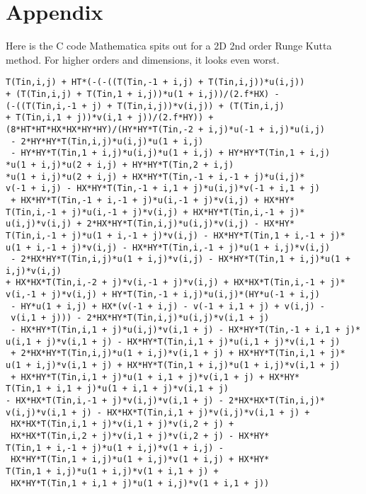 \documentclass[paper=a4, fontsize=11pt]{scrartcl} %
\numberwithin{equation}{section} %
\numberwithin{figure}{section} %
\numberwithin{table}{section} %
\begin{document}
\newpage

\section{Appendix}
Here is the C code Mathematica spits out for a 2D 2nd order Runge Kutta method. For higher orders and dimensions, it looks even worst.
\begin{verbatim}
T(Tin,i,j) + HT*(-(-((T(Tin,-1 + i,j) + T(Tin,i,j))*u(i,j)) 
+ (T(Tin,i,j) + T(Tin,1 + i,j))*u(1 + i,j))/(2.f*HX) - 
(-((T(Tin,i,-1 + j) + T(Tin,i,j))*v(i,j)) + (T(Tin,i,j) 
+ T(Tin,i,1 + j))*v(i,1 + j))/(2.f*HY)) + 
(8*HT*HT*HX*HX*HY*HY)/(HY*HY*T(Tin,-2 + i,j)*u(-1 + i,j)*u(i,j)
 - 2*HY*HY*T(Tin,i,j)*u(i,j)*u(1 + i,j)
 - HY*HY*T(Tin,1 + i,j)*u(i,j)*u(1 + i,j) + HY*HY*T(Tin,1 + i,j)
*u(1 + i,j)*u(2 + i,j) + HY*HY*T(Tin,2 + i,j)
*u(1 + i,j)*u(2 + i,j) + HX*HY*T(Tin,-1 + i,-1 + j)*u(i,j)*
v(-1 + i,j) - HX*HY*T(Tin,-1 + i,1 + j)*u(i,j)*v(-1 + i,1 + j)
 + HX*HY*T(Tin,-1 + i,-1 + j)*u(i,-1 + j)*v(i,j) + HX*HY*
T(Tin,i,-1 + j)*u(i,-1 + j)*v(i,j) + HX*HY*T(Tin,i,-1 + j)*
u(i,j)*v(i,j) + 2*HX*HY*T(Tin,i,j)*u(i,j)*v(i,j) - HX*HY*
T(Tin,i,-1 + j)*u(1 + i,-1 + j)*v(i,j) - HX*HY*T(Tin,1 + i,-1 + j)*
u(1 + i,-1 + j)*v(i,j) - HX*HY*T(Tin,i,-1 + j)*u(1 + i,j)*v(i,j)
 - 2*HX*HY*T(Tin,i,j)*u(1 + i,j)*v(i,j) - HX*HY*T(Tin,1 + i,j)*u(1 + i,j)*v(i,j) 
+ HX*HX*T(Tin,i,-2 + j)*v(i,-1 + j)*v(i,j) + HX*HX*T(Tin,i,-1 + j)*
v(i,-1 + j)*v(i,j) + HY*T(Tin,-1 + i,j)*u(i,j)*(HY*u(-1 + i,j)
 - HY*u(1 + i,j) + HX*(v(-1 + i,j) - v(-1 + i,1 + j) + v(i,j) -
 v(i,1 + j))) - 2*HX*HY*T(Tin,i,j)*u(i,j)*v(i,1 + j)
 - HX*HY*T(Tin,i,1 + j)*u(i,j)*v(i,1 + j) - HX*HY*T(Tin,-1 + i,1 + j)*
u(i,1 + j)*v(i,1 + j) - HX*HY*T(Tin,i,1 + j)*u(i,1 + j)*v(i,1 + j)
 + 2*HX*HY*T(Tin,i,j)*u(1 + i,j)*v(i,1 + j) + HX*HY*T(Tin,i,1 + j)*
u(1 + i,j)*v(i,1 + j) + HX*HY*T(Tin,1 + i,j)*u(1 + i,j)*v(i,1 + j)
 + HX*HY*T(Tin,i,1 + j)*u(1 + i,1 + j)*v(i,1 + j) + HX*HY*
T(Tin,1 + i,1 + j)*u(1 + i,1 + j)*v(i,1 + j) 
- HX*HX*T(Tin,i,-1 + j)*v(i,j)*v(i,1 + j) - 2*HX*HX*T(Tin,i,j)*
v(i,j)*v(i,1 + j) - HX*HX*T(Tin,i,1 + j)*v(i,j)*v(i,1 + j) +
 HX*HX*T(Tin,i,1 + j)*v(i,1 + j)*v(i,2 + j) +
 HX*HX*T(Tin,i,2 + j)*v(i,1 + j)*v(i,2 + j) - HX*HY*
T(Tin,1 + i,-1 + j)*u(1 + i,j)*v(1 + i,j) -
 HX*HY*T(Tin,1 + i,j)*u(1 + i,j)*v(1 + i,j) + HX*HY*
T(Tin,1 + i,j)*u(1 + i,j)*v(1 + i,1 + j) +
 HX*HY*T(Tin,1 + i,1 + j)*u(1 + i,j)*v(1 + i,1 + j)) 
\end{verbatim}


%


\end{document}
